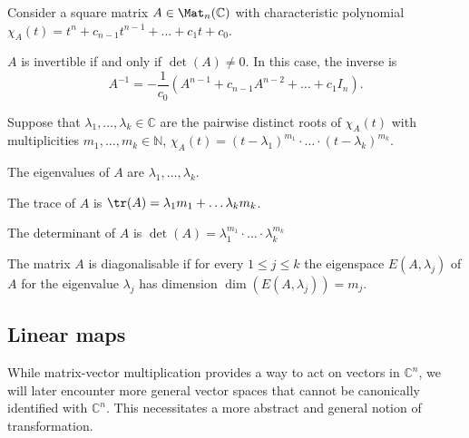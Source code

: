 \documentclass[a4paper,oneside, 12pt]{amsart}
\begin{document}
\begin{corollary}\label{cor:consequences-of-caley-hamilton}
  Consider a square matrix \( A \in \Mat_n(\mathbb{C}) \) with characteristic polynomial \(\chi_{A}(t) = t^{n} + c_{n-1} t^{n-1} + \dots + c_{1}t + c_{0}\).
  \begin{thmlist}
    \item \( A \) is invertible if and only if \( \det(A) \neq 0 \).
    In this case, the inverse is
    \begin{equation}
      A^{-1}= - \frac{1}{c_{0}}(A^{n-1} + c_{n-1} A^{n-2} + \dots + c_{1} I_{n}).
    \end{equation}
  \end{thmlist}
  Suppose that \(\lambda_{1}, \dots , \lambda_{k}\in \mathbb{C}\) are the pairwise distinct roots of \(\chi_{A}(t)\) with multiplicities  \(m_{1}, \dots , m_{k}\in \mathbb{N}\), \ie \(\chi_{A}(t) = (t-\lambda_{1})^{m_{1}} \cdot \dots \cdot (t-\lambda_{k})^{m_{k}}\).
  \begin{thmlist}[resume]
    \item  The eigenvalues of \(A\) are \(\lambda_{1}, \dots , \lambda_{k}\).
    \item  The trace of \(A\) is \(\tr(A) =  \lambda_{1}m_{1} + \dots \lambda_{k}m_{k}\).
    \item  The determinant of \(A\) is \(\det(A) = \lambda_{1}^{m_{1}} \cdot \dots \cdot \lambda_{k}^{m_{k}}\)
    \item The matrix \(A\) is diagonalisable if for every \(1\leq j\leq k\) the eigenspace \(E(A, \lambda_{j})\) of \(A\) for the eigenvalue \(\lambda_{j}\) has dimension \(\dim(E(A, \lambda_{j})) = m_{j}\).
  \end{thmlist}
\end{corollary}

\subsection{Linear maps}\label{sec:linear-maps}

While matrix-vector multiplication provides a way to act on vectors in \( \mathbb{C}^n \), we will later encounter more general vector spaces that cannot be canonically identified with \( \mathbb{C}^{n}\).
This necessitates a more abstract and general notion of transformation.
\end{document}
